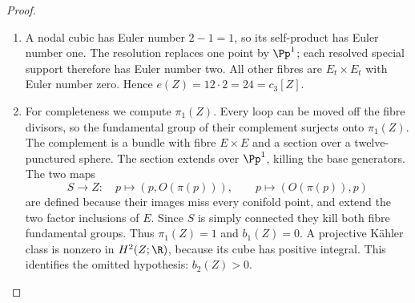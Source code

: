 \begin{proof}
\begin{enumerate}[label={$\langle1\rangle$\arabic*.},leftmargin=*]
\item A nodal cubic has Euler number $2-1=1$, so its self-product has
Euler number one. The resolution replaces one point by $\Pp^1$;
each resolved special support therefore has Euler number two.
All other fibres are $E_t\times E_t$ with Euler number zero.
Hence $e(Z)=12\cdot2=24=c_3[Z]$.

\item For completeness we compute $\pi_1(Z)$. Every loop can be moved
off the fibre divisors, so the fundamental group of their complement
surjects onto $\pi_1(Z)$. The complement is a bundle with fibre
$E\times E$ and a section over a twelve-punctured sphere. The
section extends over $\Pp^1$, killing the base generators. The
two maps
\[
 S\longrightarrow Z:\quad p\mapsto(p,O(\pi(p))),\qquad
 p\mapsto(O(\pi(p)),p)
\]
are defined because their images miss every conifold point, and
extend the two factor inclusions of $E$. Since $S$ is simply
connected they kill both fibre fundamental groups. Thus
$\pi_1(Z)=1$ and $b_1(Z)=0$. A projective Kähler class is nonzero
in $H^2(Z;\R)$, because its cube has positive integral. This
identifies the omitted hypothesis: $b_2(Z)>0$.

\end{enumerate}
\end{proof}
